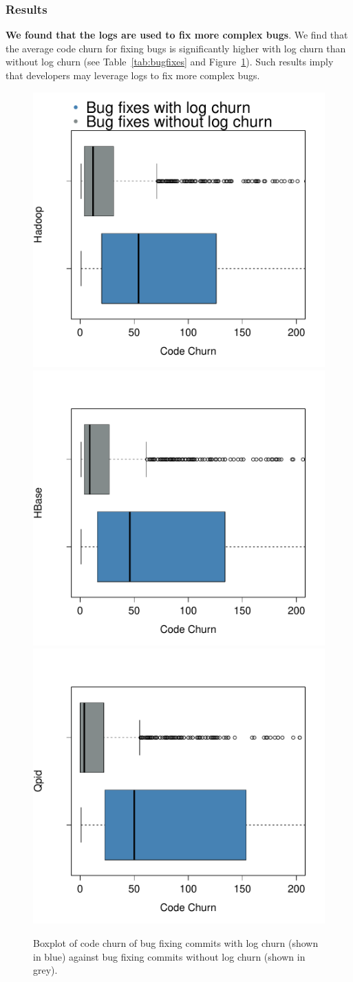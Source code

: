 \documentclass[conference]{IEEEtran}
\begin{document}
\subsubsection*{\textbf{Results}}

\textbf{We found that the logs are used to fix more complex bugs}. We find that the average code churn for fixing bugs is significantly higher with log churn than without log churn (see Table~\ref{tab:bugfixes} and Figure~\ref{fig:figure3}). Such results imply that developers may leverage logs to fix more complex bugs.


 
\begin{figure}[thb]
	\centering
	\includegraphics[width=.25\textwidth]{HadoopBoxPlot}
	\hfill
	\includegraphics[width=.25\textwidth]{HBaseBoxPlot}\hfill
	\includegraphics[width=.25\textwidth]{QpidBoxPlot}
	\caption{Boxplot of code churn of bug fixing commits with log churn (shown in blue) against bug fixing commits without log churn (shown in grey).}
	\label{fig:figure3}

\end{figure}
\end{document}
